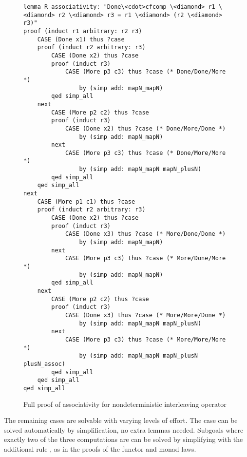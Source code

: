\begin{figure}
\def\baselinestretch{1.0}
\lstset{language=Isabelle, xleftmargin=\parindent, basicstyle=\small\sffamily}
\begin{lstlisting}
lemma R_associativity: "Done\<cdot>cfcomp \<diamond> r1 \<diamond> r2 \<diamond> r3 = r1 \<diamond> (r2 \<diamond> r3)"
proof (induct r1 arbitrary: r2 r3)
    CASE (Done x1) thus ?case
    proof (induct r2 arbitrary: r3)
        CASE (Done x2) thus ?case
        proof (induct r3)
            CASE (More p3 c3) thus ?case (* Done/Done/More *)
                by (simp add: mapN_mapN)
        qed simp_all
    next
        CASE (More p2 c2) thus ?case
        proof (induct r3)
            CASE (Done x2) thus ?case (* Done/More/Done *)
                by (simp add: mapN_mapN)
        next
            CASE (More p3 c3) thus ?case (* Done/More/More *)
                by (simp add: mapN_mapN mapN_plusN)
        qed simp_all
    qed simp_all
next
    CASE (More p1 c1) thus ?case
    proof (induct r2 arbitrary: r3)
        CASE (Done x2) thus ?case
        proof (induct r3)
            CASE (Done x3) thus ?case (* More/Done/Done *)
                by (simp add: mapN_mapN)
        next
            CASE (More p3 c3) thus ?case (* More/Done/More *)
                by (simp add: mapN_mapN)
        qed simp_all
    next
        CASE (More p2 c2) thus ?case
        proof (induct r3)
            CASE (Done x3) thus ?case (* More/More/Done *)
                by (simp add: mapN_mapN mapN_plusN)
        next
            CASE (More p3 c3) thus ?case (* More/More/More *)
                by (simp add: mapN_mapN mapN_plusN plusN_assoc)
        qed simp_all
    qed simp_all
qed simp_all
\end{lstlisting}
\caption{Full proof of associativity for nondeterministic interleaving operator}
\label{fig:case-R-assoc-proof}
\end{figure}

The remaining cases are solvable with varying levels of effort. The  case can be solved automatically by simplification, no extra lemmas needed. Subgoals where exactly two of the three computations are  can be solved by simplifying with the additional rule , as in the proofs of the functor and monad laws.


